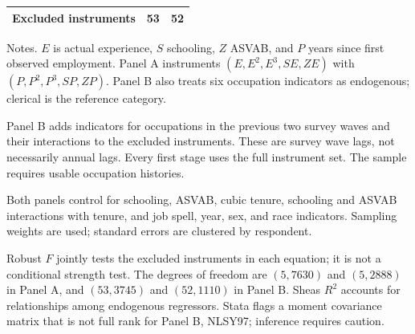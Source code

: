\documentclass[11pt]{article}
\begin{document}
\begin{table}[p]
\begin{threeparttable}
\begin{tabular*}{\textwidth}{@{\extracolsep{\fill}}lrrrr@{}}
Excluded instruments & \multicolumn{2}{c}{53} & \multicolumn{2}{c}{52} \\
\bottomrule\end{tabular*}
\begin{tablenotes}[flushleft]\fontsize{9}{10.5}\selectfont
\item Notes. $E$ is actual experience, $S$ schooling, $Z$ ASVAB, and $P$ years since first observed employment. Panel A instruments $(E,E^2,E^3,SE,ZE)$ with $(P,P^2,P^3,SP,ZP)$. Panel B also treats six occupation indicators as endogenous; clerical is the reference category.
\item Panel B adds indicators for occupations in the previous two survey waves and their interactions to the excluded instruments. These are survey wave lags, not necessarily annual lags. Every first stage uses the full instrument set. The sample requires usable occupation histories.
\item Both panels control for schooling, ASVAB, cubic tenure, schooling and ASVAB interactions with tenure, and job spell, year, sex, and race indicators. Sampling weights are used; standard errors are clustered by respondent.
\item Robust $F$ jointly tests the excluded instruments in each equation; it is not a conditional strength test. The degrees of freedom are $(5,7630)$ and $(5,2888)$ in Panel A, and $(53,3745)$ and $(52,1110)$ in Panel B. Shea\textquotesingle s $R^2$ accounts for relationships among endogenous regressors. Stata flags a moment covariance matrix that is not full rank for Panel B, NLSY97; inference requires caution.
\end{tablenotes}\end{threeparttable}\end{table}
\end{document}
